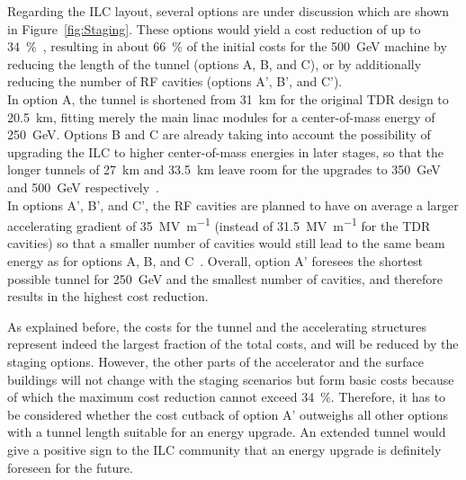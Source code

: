 Regarding the ILC layout, several options are under discussion which are shown in Figure~\ref{fig:Staging}.
These options would yield a cost reduction of up to \SI{34}{\percent}~\cite{Cost_reduction}, resulting in about \SI{66}{\percent} of the initial costs for the \SI{500}{\GeV} machine by reducing the length of the tunnel (options A, B, and C), or by additionally reducing the number of RF cavities (options A', B', and C').
\\In option A, the tunnel is shortened from \SI{31}{\kilo\meter} for the original TDR design to \SI{20.5}{\kilo\meter}, fitting merely the main linac modules for a center-of-mass energy of \SI{250}{\GeV}.
Options B and C are already taking into account the possibility of upgrading the ILC to higher center-of-mass energies in later stages, so that the longer tunnels of \SI{27}{\kilo\meter} and \SI{33.5}{\kilo\meter} leave room for the upgrades to \SI{350}{\GeV} and \SI{500}{\GeV} respectively~\cite[p. 19]{Staging}.
\\In options A', B', and C', the RF cavities are planned to have on average a larger accelerating gradient of \SI{35}{\mega\volt\per\meter} (instead of \SI{31.5}{\mega\volt\per\meter} for the TDR cavities) so that a smaller number of cavities would still lead to the same beam energy as for options A, B, and C~\cite[p. 19]{Staging}.
Overall, option A' foresees the shortest possible tunnel for \SI{250}{\GeV} and the smallest number of cavities, and therefore results in the highest cost reduction.

As explained before, the costs for the tunnel and the accelerating structures represent indeed the largest fraction of the total costs, and will be reduced by the staging options.
However, the other parts of the accelerator and the surface buildings will not change with the staging scenarios but form basic costs because of which the maximum cost reduction cannot exceed \SI{34}{\percent}.
Therefore, it has to be considered whether the cost cutback of option A' outweighs all other options with a tunnel length suitable for an energy upgrade.
An extended tunnel would give a positive sign to the ILC community that an energy upgrade is definitely foreseen for the future.

